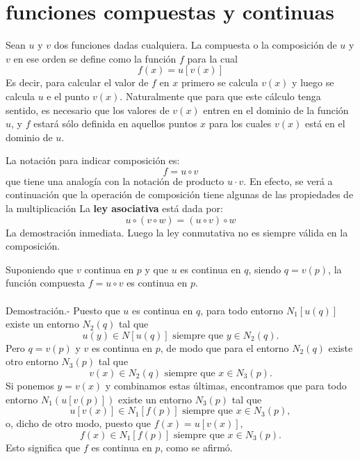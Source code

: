 \section{funciones compuestas y continuas}

    \begin{def.}
	Sean $u$ y $v$ dos funciones dadas cualquiera. La compuesta o la composición de $u$ y $v$ en ese orden se define como la función $f$ para la cual
	$$f(x)=u[v(x)]$$
	Es decir, para calcular el valor de $f$ en $x$ primero se calcula $v(x)$ y luego se calcula $u$ e el punto $v(x)$. Naturalmente que para que este cálculo tenga sentido, es necesario que los valores de $v(x)$ entren en el dominio de la función $u$, y $f$ estará sólo definida en aquellos puntos $x$ para los cuales $v(x)$ está en el dominio de $u$.
    \end{def.}

La notación para indicar composición es: 
$$f=u\circ v$$
que tiene una analogía con la notación de producto $u\cdot v$. En efecto, se verá a continuación que la operación de composición tiene algunas de las propiedades de la multiplicación
La \textbf{ley asociativa} está dada por:
$$u\circ(v\circ w) = (u\circ v)\circ w$$
La demostración  inmediata. Luego la ley conmutativa no es siempre válida en la composición.\\

\begin{teo}
    Suponiendo que $v$ continua en $p$ y que $u$ es continua en $q$, siendo $q=v(p)$, la función compuesta $f=u\circ v$ es continua en $p$.\\\\
	Demostración.-\; Puesto que $u$ es continua en $q$, para todo entorno $N_1[u(q)]$ existe un entorno $N_2(q)$ tal que 
	$$u(y)\in N[u(q)]\mbox{ siempre que } y \in N_2(q).$$
	Pero $q=v(p)$ y $v$ es continua en $p$, de modo que para el entorno $N_2(q)$ existe otro entorno $N_3(p)$ tal que 
	$$v(x)\in N_2(q)\mbox{ siempre que } x\in N_3(p).$$
	Si ponemos $y=v(x)$ y combinamos estas últimas, encontramos que para todo entorno $N_1(u[v(p)])$ existe un entorno $N_3(p)$ tal que 
	$$u[v(x)]\in N_1[f(p)]\mbox{ siempre que } x\in N_3(p),$$
	o, dicho de otro modo, puesto que $f(x)=u[v(x)],$
	$$f(x)\in N_1[f(p)]\mbox{ siempre que } x\in N_3(p).$$
	Esto significa que $f$ es continua en $p$, como se afirmó.\\\\

\end{teo}

